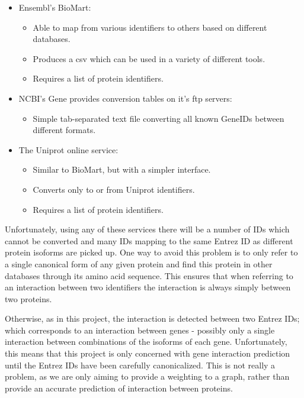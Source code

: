 \begin{itemize}
    \item Ensembl's BioMart\autocite{smedley_biomart_2009}:
        \begin{itemize}
            \item Able to map from various identifiers to others based on different databases.
            \item Produces a csv which can be used in a variety of different tools.
            \item Requires a list of protein identifiers.
        \end{itemize}
    \item NCBI's Gene\autocite{maglott_entrez_2006} provides conversion tables on it's ftp servers:
        \begin{itemize}
            \item Simple tab-separated text file converting all known GeneIDs between different formats.
        \end{itemize}
    \item The Uniprot\autocite{consortium_universal_2007} online service:
        \begin{itemize}
            \item Similar to BioMart, but with a simpler interface.
            \item Converts only to or from Uniprot identifiers.
            \item Requires a list of protein identifiers.
        \end{itemize}
\end{itemize}

Unfortunately, using any of these services there will be a number of IDs which cannot be converted and many IDs mapping to the same Entrez ID as different protein isoforms are picked up.
One way to avoid this problem is to only refer to a single canonical form of any given protein and find this protein in other databases through its amino acid sequence.
This ensures that when referring to an interaction between two identifiers the interaction is always simply between two proteins.

Otherwise, as in this project, the interaction is detected between two Entrez IDs; which corresponds to an interaction between genes - possibly only a single interaction between combinations of the isoforms of each gene.
Unfortunately, this means that this project is only concerned with gene interaction prediction until the Entrez IDs have been carefully canonicalized.
This is not really a problem, as we are only aiming to provide a weighting to a graph, rather than provide an accurate prediction of interaction between proteins.

